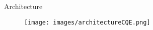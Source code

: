 \begin{comment}
\begin{frame}[fragile]{$\mathsf{DP_{ATM}}$ - Filter Stage}
\begin{itemize}
    \item Card cloning fraud pattern algorithmic evaluation
\end{itemize}
    \scalebox{0.9}{ 
    \hspace{-0.7cm}
    \begin{minipage}{1.2\textwidth} 
    \begin{algorithm}[H]
        \caption{\texttt{checkFraud}($\mathsf{S_c, e_{new}}$)}
        \label{alg:check-fraud-impl}
        \begin{algorithmic}[1]
            \Require $\mathsf{S_c}$ is a non-empty subgraph of interaction edges of card $\mathsf{c}$, 
            $\mathsf{e_{new}}$ is the \texttt{Edge} related to the new incoming opening interaction \texttt{EdgeStart} of card $\mathsf{c}$
            \State $\mathsf{e_{last}} \gets S_c[|S_c| - 1]$ \Comment{Retrieve last edge from $\mathsf{S_c}$}
            \If{$\mathsf{e_{last}}.\texttt{Tx\_end}$ is empty}
                \State \texttt{LOG: Warning: A tx ($\mathsf{e_{new}}$) starts before the previous ($\mathsf{e_{last}}$) ends!}
                \Return
            \EndIf
            \If{$\mathsf{e_{last}}.\texttt{ATM\_id} \neq \mathsf{e_{new}}.\texttt{ATM\_id}$}
                \State $\texttt{t\_min} \gets \text{obtainTmin}(\mathsf{e_{last}}, \mathsf{e_{new}})$
                \State $\texttt{t\_diff} \gets \mathsf{e_{new}}.\texttt{Tx\_start} - \mathsf{e_{last}}.\texttt{Tx\_end}$
                \If{$\texttt{t\_diff} < \texttt{t\_min}$}   
                    \State $\text{emitAlert}(\mathsf{e_{last}}, \mathsf{e_{new}})$
                \EndIf
            \EndIf
        \end{algorithmic}
    \end{algorithm}
    \end{minipage}
    }
\end{frame}
\end{comment}

\begin{comment}
\begin{frame}{$\mathsf{DP_{ATM}}$ - Filter Stage}
    \begin{itemize}
         \item \textbf{Filter \emph{worker}}.
         \item Simultaneously (many possible) different continuous query patterns: $FP_1, FP_2, ..., FP_n$.
    \end{itemize}

    \begin{figure}
        \centering
        \texttt{[image: figures/engine-filter-worker-1.png]}
   \end{figure}
\end{frame}
\end{comment}

\begin{frame}{Architecture}
\begin{figure}
    \centering
    \hspace*{-1cm}
    \texttt{[image: images/architectureCQE.png]}
\end{figure}
\end{frame}
